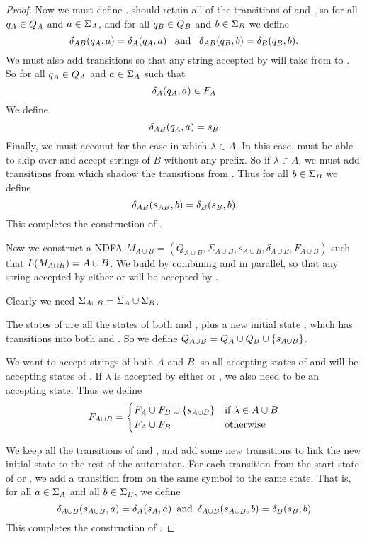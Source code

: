 \documentclass{bcthesis}
\begin{document}
\begin{proof}
		Now we must define \dalab.
		\mab should retain all of the transitions of \ma and \mb, so for all $q_A \in Q_A$ and $a \in \Sigma_A$, and for all $q_B \in Q_B$ and $b \in \Sigma_B$ we define
		\[
			\delta_{AB}(q_A, a) = \delta_A(q_A, a) \enspace \text{ and } \enspace \delta_{AB}(q_B, b) = \delta_B(q_B, b).
		\]
		We must also add transitions so that any string accepted by \ma will take \mab from \sab to \sb.
		So for all $q_A \in Q_A$ and $a \in \Sigma_A$ such that 
		\[
			\delta_A(q_A, a) \in F_A
		\]
		We define
		\[
			\delta_{AB}(q_A, a) = s_B
		\]
		Finally, we must account for the case in which $\lambda \in A$.
		In this case, \mab must be able to skip over \ma and accept strings of $B$ without any prefix.
		So if $\lambda \in A$, we must add transitions from \sab which shadow the transitions from \sb.
		Thus for all $b \in \Sigma_B$ we define
		\[
			\delta_{AB}(s_{AB}, b) = \delta_B(s_B, b)
		\]
		This completes the construction of \mab.

		Now we construct a NDFA $M_{A \cup B} = (Q_{A \cup B}, \Sigma_{A \cup B}, s_{A \cup B}, \delta_{A \cup B}, F_{A \cup B})$ such that $L(M_{A \cup B}) = A \cup B$.
		We build \maub by combining \ma and \mb in parallel, so that any string accepted by either \ma or \mb will be accepted by \maub.
		
		Clearly we need $\Sigma_{A \cup B} = \Sigma_A \cup \Sigma_B$.

		The states of \maub are all the states of both \ma and \mb, plus a new initial state \saub, which has transitions into both \ma and \mb.
		So we define $Q_{A \cup B} = Q_A \cup Q_B \cup \{ s_{A \cup B} \}$.

		We want \maub to accept strings of both $A$ and $B$, so all accepting states of \ma and \mb will be accepting states of \maub.
		If $\lambda$ is accepted by either \ma or \mb, we also need \saub to be an accepting state. 
		Thus we define 
		\[
			F_{A \cup B} =	\begin{cases}
						F_A \cup F_B \cup \{ s_{A \cup B} \} &\text{if } \lambda \in A \cup B \\
						F_A \cup F_B &\text{otherwise}
					\end{cases}
		\]

		We keep all the transitions of \ma and \mb, and add some new transitions to link the new initial state to the rest of the automaton.
		For each transition from the start state of \ma or \mb, we add a transition from \saub on the same symbol to the same state.
		That is, for all $a \in \Sigma_A$ and all $b \in \Sigma_B$, we define
		\[
			\delta_{A \cup B}(s_{A \cup B}, a) = \delta_A(s_A, a) \enspace \text{and} \enspace \delta_{A \cup B}(s_{A \cup B}, b) = \delta_B(s_B, b)
		\]
		This completes the construction of \maub.


\end{proof}
\end{document}

